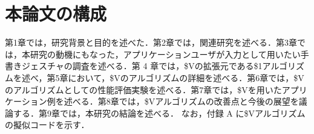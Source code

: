 \section{本論文の構成}
第1章では，研究背景と目的を述べた．第2章では，関連研究を述べる．第3章では，本研究の動機にもなった，アプリケーションユーザが入力として用いたい手書きジェスチャの調査を述べる．第 4 章では，\$Vの拡張元である\$1アルゴリズムを述べ，第5章において，\$Vのアルゴリズムの詳細を述べる．第6章では，\$Vのアルゴリズムとしての性能評価実験を述べる．第7章では，\$Vを用いたアプリケーション例を述べる．第8章では，\$Vアルゴリズムの改善点と今後の展望を議論する．第9章では，本研究の結論を述べる．
なお，付録 A に\$Vアルゴリズムの擬似コードを示す．
